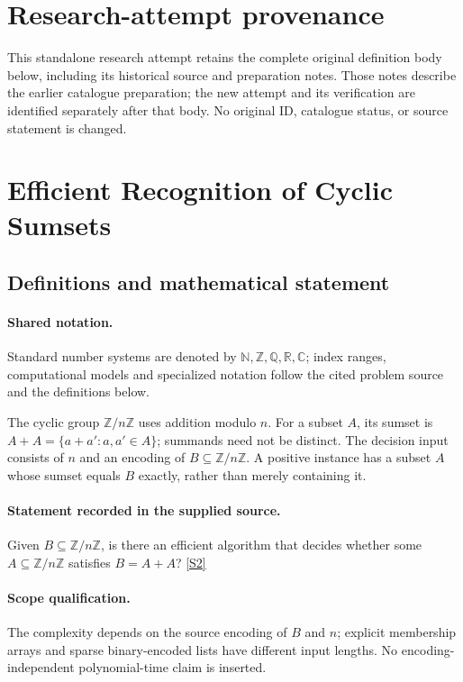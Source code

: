 \documentclass[11pt]{article}
\begin{document}
\section*{Research-attempt provenance}
This standalone research attempt retains the complete original definition body below,
including its historical source and preparation notes. Those notes describe the
earlier catalogue preparation; the new attempt and its verification are identified
separately after that body. No original ID, catalogue status, or source statement is changed.

\section{Efficient Recognition of Cyclic Sumsets}\label{statement}

\subsection{Definitions and mathematical statement}

\paragraph{Shared notation.}Standard number systems are denoted by $\mathbb N,\mathbb Z,\mathbb Q,\mathbb R,\mathbb C$; index ranges, computational models and specialized notation follow the cited problem source and the definitions below.


The cyclic group $\mathbb Z/n\mathbb Z$ uses addition modulo $n$. For a subset $A$, its sumset is $A+A=\{a+a':a,a'\in A\}$; summands need not be distinct. The decision input consists of $n$ and an encoding of $B\subseteq\mathbb Z/n\mathbb Z$. A positive instance has a subset $A$ whose sumset equals $B$ exactly, rather than merely containing it.
\paragraph{Statement recorded in the supplied source.}
Given $B\subseteq\mathbb Z/n\mathbb Z$, is there an efficient algorithm that decides whether some $A\subseteq\mathbb Z/n\mathbb Z$ satisfies $B=A+A$? \href{https://doi.org/10.4171/owr/2022/22}{[S2]}
\paragraph{Scope qualification.}
The complexity depends on the source encoding of $B$ and $n$; explicit membership arrays and sparse binary-encoded lists have different input lengths. No encoding-independent polynomial-time claim is inserted.
\end{document}
